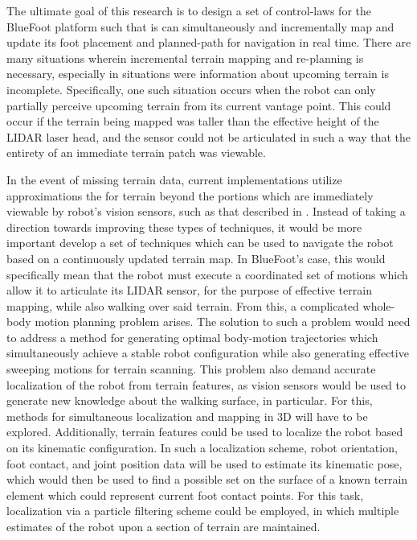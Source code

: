 The ultimate goal of this research is to design a set of control-laws for the BlueFoot platform such that is can simultaneously and incrementally map and update its foot placement and planned-path for navigation in real time. There are many situations wherein incremental terrain mapping and re-planning is necessary, especially in situations were information about upcoming terrain is incomplete. Specifically, one such situation occurs when the robot can only partially perceive upcoming terrain from its current vantage point. This could occur if the terrain being mapped was taller than the effective height of the LIDAR laser head, and the sensor could not be articulated in such a way that the entirety of an immediate terrain patch was viewable. 

In the event of missing terrain data, current implementations utilize approximations the for terrain beyond the portions which are immediately viewable by robot's vision sensors, such as that described in \cite{Kolter2009}. Instead of taking a direction towards improving these types of techniques, it would be more important develop a set of techniques which can be used to navigate the robot based on a continuously updated terrain map. In BlueFoot's case, this would specifically mean that the robot must execute a coordinated set of motions which allow it to articulate its LIDAR sensor, for the purpose of effective terrain mapping, while also walking over said terrain. From this, a complicated whole-body motion planning problem arises. The solution to such a problem would need to address a method for generating optimal body-motion trajectories which simultaneously achieve a stable robot configuration while also generating effective sweeping motions for terrain scanning. This problem also demand accurate localization of the robot from terrain features, as vision sensors would be used to generate new knowledge about the walking surface, in particular. For this, methods for simultaneous localization and mapping in 3D will have to be explored. Additionally, terrain features could be used to localize the robot based on its kinematic configuration. In such a localization scheme, robot orientation, foot contact, and joint position data will be used to estimate its kinematic pose, which would then be used to find a possible set on the surface of a known terrain element which could represent current foot contact points. For this task, localization via a particle filtering scheme could be employed, in which multiple estimates of the robot upon a section of terrain are maintained.

